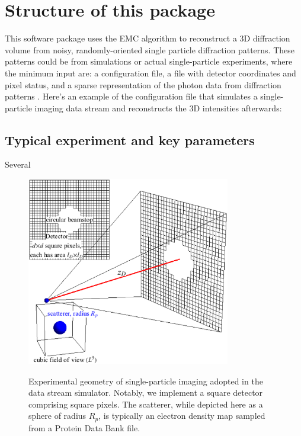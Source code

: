 \documentclass[]{iucr}              %
\begin{document}
\section{Structure of this package}
This software package uses the EMC algorithm to reconstruct a 3D diffraction volume from noisy, randomly-oriented single particle diffraction patterns. These patterns could be from simulations or actual single-particle experiments, where the minimum input are: a configuration file, a file with detector coordinates and pixel status, and a sparse representation of the photon data from diffraction patterns . Here's an example of the configuration file that simulates a single-particle imaging data stream and reconstructs the 3D intensities afterwards:


\subsection{Typical experiment and key parameters}
Several 

\begin{figure}
\caption{Experimental geometry of single-particle imaging adopted in the data stream simulator. Notably, we implement a square detector comprising square pixels. The scatterer, while depicted here as a sphere of radius $R_p$, is typically an electron density map sampled from a Protein Data Bank file.}
\includegraphics[width=3.5in]{figures/geometry.eps} \label{fig:expGeometry}
\end{figure}
\end{document}
